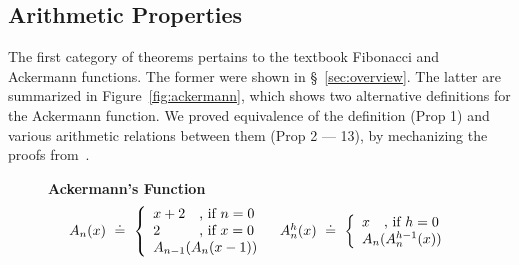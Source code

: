 \subsection{Arithmetic Properties} \label{subsec:arith} \label{subsec:ackermann}

The first category of theorems pertains to the textbook
Fibonacci and Ackermann functions.
%
The former were shown in \S~\ref{sec:overview}.
%
The latter are summarized in Figure~\ref{fig:ackermann},
which shows two alternative definitions for the
Ackermann function.
%
We proved equivalence of the definition (Prop 1)
and various arithmetic relations between
them (Prop 2 --- 13), by mechanizing the
proofs from~\cite{ackermann}.

\begin{figure}[t!]
\centering
\captionsetup{justification=centering}
\textbf{Ackermann's Function}
\[
\begin{array}{lr}
\ack{n}{x} \defeq
 \left\{
\begin{array}{l}
\setlength\arraycolsep{0pt}
\begin{array}{ll}
      x+2 &\quad \text{, if}\ n=0 \\
      2   &\quad \text{, if}\ x=0 \\
\end{array} \\
\ack{n-1}{\ack{n}{x-1}}
\end{array}
\right.
&
\iack{h}{n}{x} \defeq
 \left\{
\begin{array}{l}
      x \quad \text{, if}\ h=0 \\
      \ack{n}{\iack{h-1}{n}{x}}
\end{array}
\right.
\end{array}
 \]


\end{figure}
